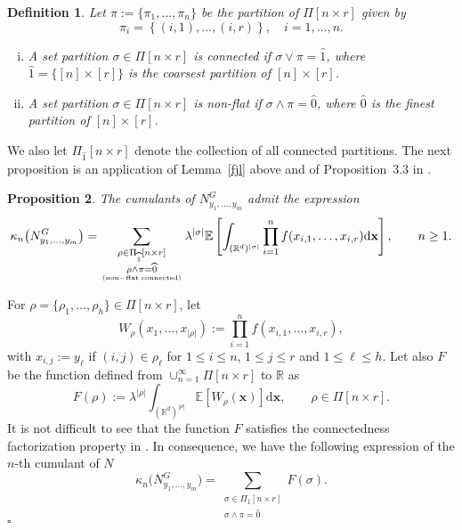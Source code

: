 \documentclass[12pt]{article}
\newcommand{\R}{\mathbb{R}}
\newcommand{\E}{\mathbb{E}}
\newtheorem{prop}{Proposition}[section]
\newtheorem{definition}[prop]{Definition}
\newenvironment{Proof}{\removelastskip\par\medskip
\noindent{\em Proof.} \rm}{\penalty-20\null\hfill$\square$\par\medbreak}
\numberwithin{equation}{section}
\begin{document}
\begin{definition}
  Let $\pi:=\{\pi_1, \ldots ,\pi_n\}$ be the partition of $\Pi[n\times r]$
  given by 
  $$
  \pi_i=\left\{(i,1), \ldots ,(i,r)\right\},
  \quad
  i=1, \ldots , n.
  $$
 \begin{enumerate}[i)]
   \item A set partition $\sigma\in\Pi[n\times r]$ is connected if $\sigma\vee\pi=\widehat{1}$, 
     where $\widehat{1} = \{ [n]\times [r] \}$
is the coarsest partition of $[n]\times [r]$. 
\item 
 A set partition $\sigma\in\Pi[n\times r]$ is non-flat if $\sigma\wedge\pi=\widehat{0}$,
 where $\widehat{0}$ is the finest partition of $[n]\times [r]$.
 \end{enumerate} 
   \end{definition}
   We also let
   $\Pi_{\widehat{1}}[n\times r]$ denote the collection of all connected partitions. 
The next proposition is an application of Lemma~\ref{fjl} above
 and of Proposition~3.3 in \cite{LiuPrivault}. 
\begin{prop}
 The cumulants of $N_{y_1,\ldots , y_m}^G$ admit the expression 
 \begin{equation}
\nonumber %
\kappa_n\big(N_{y_1,\ldots , y_m}^G\big) =
    \sum_{\substack{\rho\in\Pi_{\widehat{1}}[n\times r]\\\rho\wedge\pi=\widehat{0}} \atop {\rm (non-flat \ \! connected)}}
   \lambda^{|\sigma |}
   \E\left[
     \int_{(\R^d)^{|\sigma |}}
     \prod_{i=1}^nf(x_{i,1}, \ldots ,x_{i,r})
     \mathrm{d}\mathbf{x}
     \right], 
  \qquad n\geq 1. 
\end{equation}
\end{prop}
\begin{Proof}
 For $\rho=\{\rho_1,\dots,\rho_h\}\in\Pi[n\times r]$, let 
\begin{equation}
W_\rho(x_1,\dots,x_{|\rho|}):=\prod_{i=1}^nf(x_{i,1},\dots,x_{i,r}),
\end{equation}
with $x_{i,j}:=y_\ell$ if $(i,j)\in\rho_\ell$ for $1\leq i\leq n$, $1\leq j\leq r$ and $1\le\ell\leq h$. Let also $F$ be the function
 defined from $\cup_{n=1}^{\infty}\Pi[n\times r]$ to $\R$ as 
\begin{equation}
  F(\rho):=\lambda^{|\rho|}\int_{(\R^d)^{|\rho|}}\E\left[W_\rho(\mathbf{x})\right]\mathrm{d}\mathbf{x},
  \qquad 
 \rho\in\Pi [n\times r]. 
\end{equation}
It is not difficult to see that the function $F$ satisfies the connectedness factorization property in \cite[Definition~3.1]{LiuPrivault}. In consequence, we have the following expression of the $n$-th cumulant of $N$
\begin{equation}
  \label{connectedcumulant}
  \kappa_n\big(N_{y_1,\ldots , y_m}^G\big)
  =\sum_{\substack{\sigma\in\Pi_{\widehat{1}}[n\times r]\\\sigma\wedge\pi=\widehat{0}}}F(\sigma).
\end{equation}
\end{Proof} 
\end{document}
